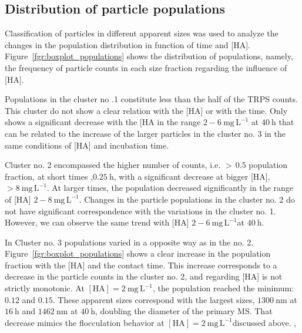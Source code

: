 \documentclass[journal=langd5,manuscript=article]{achemso}
\begin{document}
\subsection{Distribution of particle populations}

Classification of particles in different apparent sizes was used to analyze the changes in the population distribution in function of time and [HA]. Figure~\ref{fgr:boxplot_populations} shows the distribution of populations, namely, the frequency of particle counts in each size fraction regarding the influence of [HA].

Populations in the cluster no .1 constitute less than the half of the TRPS counts. This cluster do not show a clear relation with the [HA] or with the time. Only  shows a  significant decrease with the [HA in the range $2-6~\mathrm{mg\,L^{-1}}$ at $40~\mathrm{h}$ that can be related to the increase of the larger particles in the cluster no. 3 in the same conditions of [HA] and incubation time.

Cluster no. 2 encompassed the higher number of counts, i.e. $>\,0.5$ population fraction, at short times ,$0.25~\mathrm{h}$, with a significant decrease at bigger [HA], $>8~\mathrm{mg\,L^{-1}}$. At larger times, the population decreased significantly in the range of [HA] $2-8~\mathrm{mg\,L^{-1}}$. Changes in the particle populations in the cluster no. 2 do not have significant correspondence  with the variations in the cluster no. 1. However, we can observe the same trend with [HA] $2-6~\mathrm{mg\,L^{-1}}$at $40~\mathrm{h}$.

In Cluster no. 3 populations varied in a opposite way as in the no. 2. Figure~\ref{fgr:boxplot_populations} shows a clear increase in the population fraction with the [HA] and the contact time. This increase corresponds to a decrease in the particle counts in the cluster no. 2, and regarding [HA] is not strictly monotonic. At $\mathrm{[HA]} = 2~\mathrm{mg\,L^{-1}}$, the  population reached the  minimum: $0.12$  and $0.15$. These apparent sizes correspond with the largest sizes, $1300~\mathrm{nm}$ at $16~\mathrm{h}$ and $1462~\mathrm{nm}$ at $40~\mathrm{h}$, doubling the diameter of the primary MS. That decrease mimics the flocculation behavior at $\mathrm{[HA]} = 2~\mathrm{mg\,L^{-1}}$discussed above. ,
\end{document}
